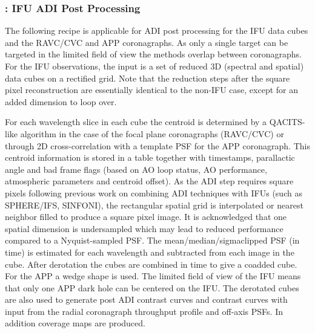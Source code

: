 \subsubsection{: IFU ADI Post Processing}
\label{sssec:adi_ifu}


The following recipe is applicable for ADI post processing for the IFU
data cubes and the RAVC/CVC and APP coronagraphs. As only a single
target can be targeted in the limited field of view the methods
overlap between coronagraphs.  For the IFU observations, the input is
a set of reduced 3D (spectral and spatial) data cubes on a rectified
grid. Note that the reduction steps after the square pixel reconstruction
are essentially identical to the non-IFU case, except for an added dimension
to loop over. 

For each wavelength slice in each cube the centroid is determined by a
QACITS-like algorithm in the case of the focal plane coronagraphs
(RAVC/CVC) or through 2D cross-correlation with a template PSF for the
APP coronagraph. This centroid information is stored in a table
together with timestamps, parallactic angle and bad frame flags (based
on AO loop status, AO performance, atmospheric parameters and centroid
offset).  As the ADI step requires square pixels following previous
work on combining ADI techniques with IFUs (such as SPHERE/IFS,
SINFONI), the rectangular spatial grid is interpolated or nearest
neighbor filled to produce a square pixel image.  It is acknowledged
that one spatial dimension is undersampled which may lead to reduced
performance compared to a Nyquist-sampled PSF.  The
mean/median/sigmaclipped PSF (in time) is estimated for each
wavelength and subtracted from each image in the cube.  After
derotation the cubes are combined in time to give a coadded cube. For
the APP a wedge shape is used. The limited field of view of the IFU
means that only one APP dark hole can be centered on the IFU. The derotated cubes
are also used to generate post ADI contrast curves and contrast curves
with input from the radial coronagraph throughput profile and off-axis
PSFs. In addition coverage maps are produced.


